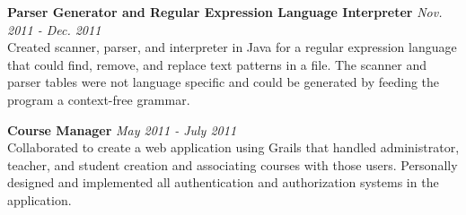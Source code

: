\documentclass{article}
\makeatletter
\newcommand{\entry}[1]{\def \@entry {#1}}
\newcommand{\dates}[1]{\def \@dates {#1}}
\newenvironment{datedentry}{
	\vspace{0.5em}
	{\bf \@entry} \hfill {\it \@dates} \\
}{}
\makeatother
\begin{document}
\entry{Parser Generator and Regular Expression Language Interpreter}
\dates{Nov. 2011 - Dec. 2011}
\begin{datedentry}
	Created scanner, parser, and interpreter in Java for a regular expression
	language that could find, remove, and replace text patterns in a file. The
	scanner and parser tables were not language specific and could be generated
	by feeding the program a context-free grammar.
\end{datedentry}

\entry{Course Manager}
\dates{May 2011 - July 2011}
\begin{datedentry}
	Collaborated to create a web application using Grails that handled
	administrator, teacher, and student creation and associating courses with
	those users. Personally designed and implemented all authentication and
	authorization systems in the application.
\end{datedentry}
\end{document}
